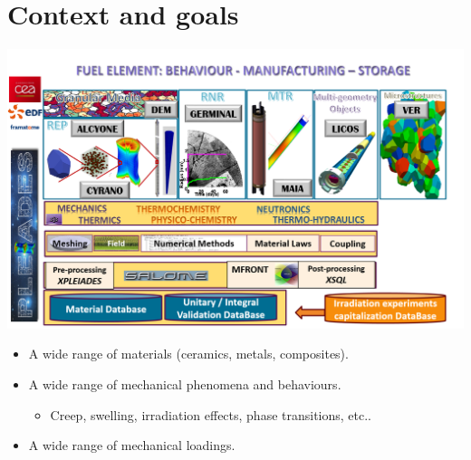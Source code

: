 \documentclass{beamer}
\begin{document}
\PageTitre{}

\begin{frame}[fragile]
  \begin{flushleft}
    {\tiny
      \tableofcontents[hideallsubsections]      
    }
  \end{flushleft}
\end{frame}

\section{Context and goals}

\begin{frame}[fragile]
  \begin{center}
    \includegraphics[width=0.70\linewidth]{img/PLEIADES_2019_en.png}
  \end{center}
  \begin{itemize}
  \item A wide range of materials (ceramics, metals, composites).
  \item A wide range of mechanical phenomena and behaviours.
    \begin{itemize}
    \item Creep, swelling, irradiation effects, phase transitions, etc..
    \end{itemize}
  \item A wide range of mechanical loadings.
  \end{itemize}
\end{frame}
\end{document}
